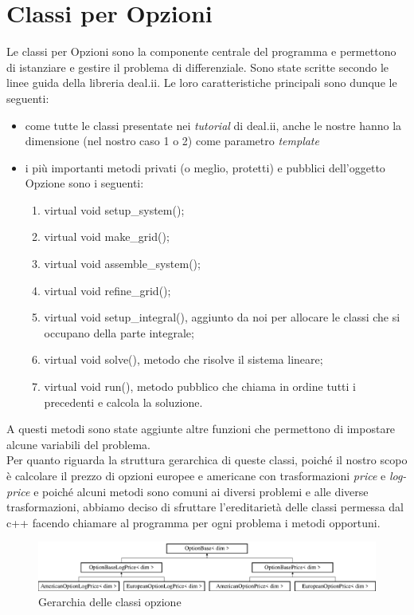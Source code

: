 \documentclass[a4paper,10pt]{report}
\theoremstyle{plain}
\theoremstyle{definition}
\theoremstyle{remark}
\begin{document}
\section{Classi per Opzioni}
Le classi per Opzioni sono la componente centrale del programma e permettono di istanziare e gestire il problema di differenziale. Sono state scritte secondo le linee guida della libreria \textsf{deal.ii}. Le loro caratteristiche principali sono dunque le seguenti:
\begin{itemize}
\item {come tutte le classi presentate nei \emph{tutorial} di \textsf{deal.ii}, anche le nostre hanno la dimensione (nel nostro caso 1 o 2) come parametro \emph{template}}
\item {i pi\`u importanti metodi privati (o meglio, protetti) e pubblici dell'oggetto Opzione sono i seguenti:}
\begin{enumerate}
\item \textsf{virtual void setup\_system()};
\item \textsf{virtual void make\_grid()};
\item \textsf{virtual void assemble\_system()};
\item \textsf{virtual void refine\_grid()};
\item \textsf{virtual void setup\_integral()}, aggiunto da noi per allocare le classi che si occupano della parte integrale;
\item \textsf{virtual void solve()}, metodo che risolve il sistema lineare;
\item \textsf{virtual void run()}, metodo pubblico che chiama in ordine tutti i precedenti e calcola la soluzione.
\end{enumerate}
\end{itemize}
A questi metodi sono state aggiunte altre funzioni che permettono di impostare alcune variabili del problema.\\Per quanto riguarda la struttura gerarchica di queste classi, poich\'e il nostro scopo \`e calcolare il prezzo di opzioni europee e americane con trasformazioni \emph{price} e \emph{log-price} e poich\'e alcuni metodi sono comuni ai diversi problemi e alle diverse trasformazioni, abbiamo deciso di sfruttare l'ereditariet\`a delle classi permessa dal c++ facendo chiamare al programma per ogni problema i metodi opportuni.
\begin{figure}[h!]
\begin{center}
\includegraphics[width=12cm]{img/classOptionBase.eps}
\caption{Gerarchia delle classi opzione}
\label{optionbase}
\end{center}
\end{figure}
\end{document}
